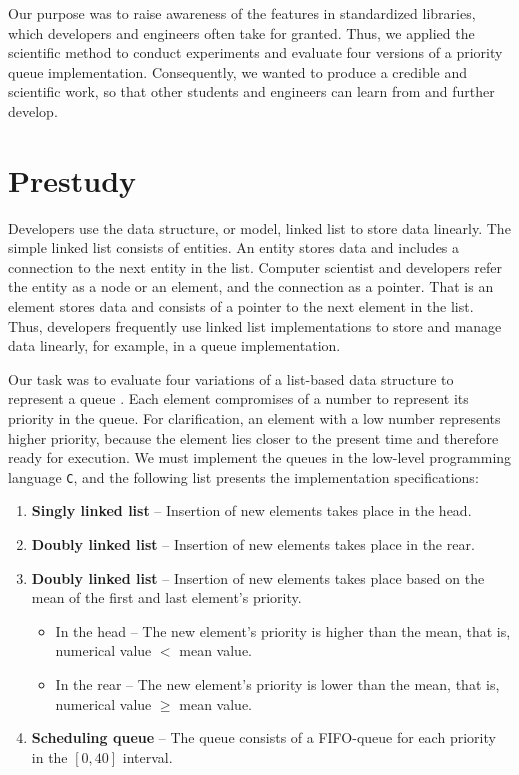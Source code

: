 \documentclass[a4paper,11pt]{kth-mag}
\newcommand*{\skippara}{\par\vspace{\baselineskip} \noindent}
\begin{document}
\skippara Our purpose was to raise awareness of the features in standardized libraries, which developers and engineers often take for granted. Thus, we applied the scientific method to conduct experiments and evaluate four versions of a priority queue implementation. Consequently, we wanted to produce a credible and scientific work, so that other students and engineers can learn from and further develop.

\section{Prestudy}\label{sec:prestudy}
Developers use the data structure, or model, linked list to store data linearly.
The simple linked list consists of entities.
An entity stores data and includes a connection to the next entity in the list.
Computer scientist and developers refer the entity as a node or an element, and the connection as a pointer.
That is an element stores data and consists of a pointer to the next element in the list.
Thus, developers frequently use linked list implementations to store and manage data linearly, for example, in a queue implementation.

\skippara Our task was to evaluate four variations of a list-based data structure to represent a queue \cite{Uppgiftl9:online}.
Each element compromises of a number to represent its priority in the queue.
For clarification, an element with a low number represents higher priority, because the element lies closer to the present time and therefore ready for execution.
We must implement the queues in the low-level programming language \texttt{C}, and the following list presents the implementation specifications:
\begin{enumerate}
    \item \textbf{Singly linked list} -- Insertion of new elements takes place in the head.
    \item \textbf{Doubly linked list} -- Insertion of new elements takes place in the rear.
        \item \textbf{Doubly linked list} -- Insertion of new elements takes place based on the mean of the first and last element's priority.
        \begin{itemize}
            \item In the head -- The new element's priority is higher than the mean, that is, \\numerical value $<$ mean value.
            \item In the rear -- The new element's priority is lower than the mean, that is,\\numerical value $\ge$ mean value.
        \end{itemize}
    \item \textbf{Scheduling queue} -- The queue consists of a FIFO-queue for each priority in the $[0,40]$ interval.
\end{enumerate}
\end{document}
